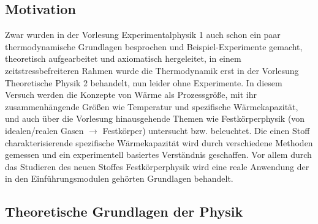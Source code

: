 \subsection{Motivation}
Zwar wurden in der Vorlesung Experimentalphysik 1 auch schon ein paar thermodynamische Grundlagen besprochen und Beispiel-Experimente gemacht, theoretisch aufgearbeitet und axiomatisch hergeleitet, in einem zeitstressbefreiteren Rahmen wurde die Thermodynamik erst in der Vorlesung Theoretische Physik 2 behandelt, nun leider ohne Experimente. In diesem Versuch werden die Konzepte von Wärme als Prozessgröße, mit ihr zusammenhängende Größen wie Temperatur und spezifische Wärmekapazität, und auch über die Vorlesung hinausgehende Themen wie Festkörperphysik (von idealen/realen Gasen \(\rightarrow\) Festkörper) untersucht bzw. beleuchtet. Die einen Stoff charakterisierende spezifische Wärmekapazität wird durch verschiedene Methoden gemessen und ein experimentell basiertes Verständnis geschaffen. Vor allem durch das Studieren des neuen Stoffes Festkörperphysik wird eine reale Anwendung der in den Einführungsmodulen gehörten Grundlagen behandelt.

\subsection[Theoretische Grundlagen der Physik]{Theoretische Grundlagen der Physik \autocite{Skript_1}}
